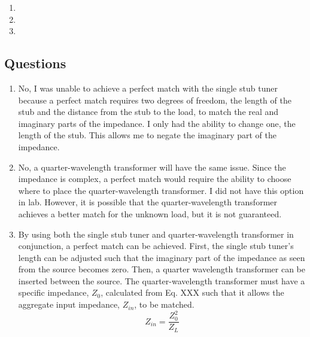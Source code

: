 \documentclass{article}
\begin{document}
\begin{enumerate}
	\item
	\item
	\item
\end{enumerate}

\subsection{Questions}

\begin{enumerate}
	\item No, I was unable to achieve a perfect match with the single stub tuner because a perfect match requires two degrees of freedom, the length of the stub and the distance from the stub to the load, to match the real and imaginary parts of the impedance. I only had the ability to change one, the length of the stub. This allows me to negate the imaginary part of the impedance.
	\item No, a quarter-wavelength transformer will have the same issue. Since the impedance is complex, a perfect match would require the ability to choose where to place the quarter-wavelength transformer. I did not have this option in lab. However, it is possible that the quarter-wavelength transformer achieves a better match for the unknown load, but it is not guaranteed.
	\item By using both the single stub tuner and quarter-wavelength transformer in conjunction, a perfect match can be achieved. First, the single stub tuner's length can be adjusted such that the imaginary part of the impedance as seen from the source becomes zero. Then, a quarter wavelength transformer can be inserted between the source. The quarter-wavelength transformer must have a specific impedance, $Z_0$, calculated from Eq. XXX such that it allows the aggregate input impedance, $Z_{in}$, to be matched.
	\begin{equation}
		Z_{in} = \dfrac{Z_0^2}{Z_L}
	\end{equation}
\end{enumerate}
\end{document}
